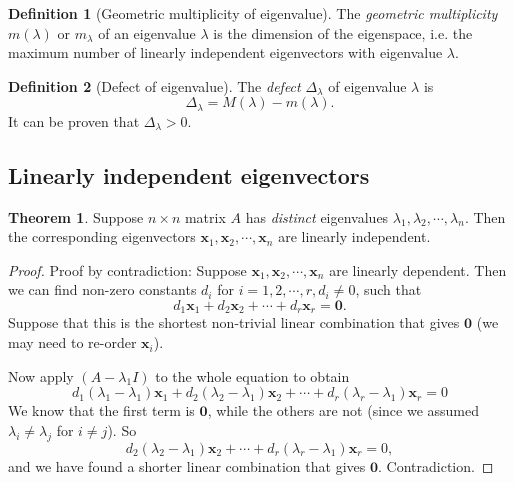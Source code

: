 \documentclass[a4paper]{article}
\theoremstyle{definition}
\newtheorem*{thm}{Theorem}
\newtheorem*{defi}{Definition}
\newcommand{\mb}[1]{\mathbf{#1}}
\begin{document}
\begin{defi}[Geometric multiplicity of eigenvalue]
  The \emph{geometric multiplicity} $m(\lambda)$ or $m_\lambda$ of an eigenvalue $\lambda$ is the dimension of the eigenspace, i.e. the maximum number of linearly independent eigenvectors with eigenvalue $\lambda$.
\end{defi}

\begin{defi}[Defect of eigenvalue]
  The \emph{defect} $\Delta_\lambda$ of eigenvalue $\lambda$ is
  \[
  \Delta_\lambda = M(\lambda) - m(\lambda).
  \]
  It can be proven that $\Delta_\lambda > 0$.
\end{defi}

\subsection{Linearly independent eigenvectors}
\begin{thm}
  Suppose $n\times n$ matrix $A$ has \emph{distinct} eigenvalues $\lambda_1, \lambda_2, \cdots, \lambda_n$. Then the corresponding eigenvectors $\mb{x}_1, \mb{x}_2, \cdots, \mb{x}_n$ are linearly independent.
\end{thm}

\begin{proof}
  Proof by contradiction: Suppose $\mb{x}_1, \mb{x}_2, \cdots, \mb{x}_n$ are linearly dependent. Then we can find non-zero constants $d_i$ for $i = 1, 2, \cdots, r, d_i\not= 0$, such that
  \[
  d_1\mb{x}_1 + d_2\mb{x}_2 + \cdots + d_r\mb{x}_r = \mb{0}.
  \]
  Suppose that this is the shortest non-trivial linear combination that gives $\mb{0}$ (we may need to re-order $\mb{x}_i$).

  Now apply $(A - \lambda_1 I)$ to the whole equation to obtain
  \[
  d_1(\lambda_1 - \lambda_1)\mb{x}_1 + d_2(\lambda_2 - \lambda_1)\mb{x}_2 + \cdots + d_r(\lambda_r - \lambda_1)\mb{x}_r = 0
  \]
  We know that the first term is $\mb{0}$, while the others are not (since we assumed $\lambda_i \not= \lambda_j$ for $i\not= j$). So
  \[
  d_2(\lambda_2 - \lambda_1)\mb{x}_2 + \cdots + d_r(\lambda_r - \lambda_1)\mb{x}_r = 0,
  \]
  and we have found a shorter linear combination that gives $\mb{0}$. Contradiction.
\end{proof}
\end{document}
